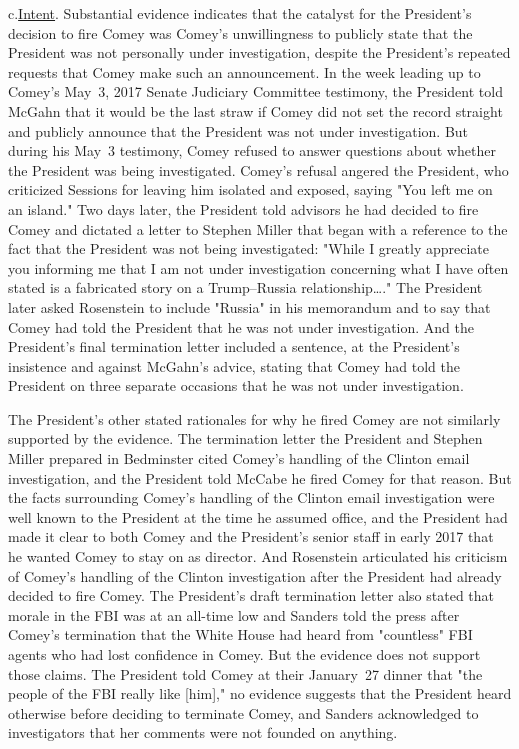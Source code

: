 c.\qquad\underline{Intent}.
Substantial evidence indicates that the catalyst for the President's decision to fire Comey was Comey's unwillingness to publicly state that the President was not personally under investigation, despite the President's repeated requests that Comey make such an announcement.
In the week leading up to Comey's May~3, 2017 Senate Judiciary Committee testimony, the President told McGahn that it would be the last straw if Comey did not set the record straight and publicly announce that the President was not under investigation.
But during his May~3 testimony, Comey refused to answer questions about whether the President was being investigated.
Comey's refusal angered the President, who criticized Sessions for leaving him isolated and exposed, saying "You left me on an island."
Two days later, the President told advisors he had decided to fire Comey and dictated a letter to Stephen Miller that began with a reference to the fact that the President was not being investigated:
"While I greatly appreciate you informing me that I am not under investigation concerning what I have often stated is a fabricated story on a Trump--Russia relationship\dots."
The President later asked Rosenstein to include "Russia" in his memorandum and to say that Comey had told the President that he was not under investigation.
And the President's final termination letter included a sentence, at the President's insistence and against McGahn's advice, stating that Comey had told the President on three separate occasions that he was not under investigation.

The President's other stated rationales for why he fired Comey are not similarly supported by the evidence.
The termination letter the President and Stephen Miller prepared in Bedminster cited Comey's handling of the Clinton email investigation, and the President told McCabe he fired Comey for that reason.
But the facts surrounding Comey's handling of the Clinton email investigation were well known to the President at the time he assumed office, and the President had made it clear to both Comey and the President's senior staff in early 2017 that he wanted Comey to stay on as director.
And Rosenstein articulated his criticism of Comey's handling of the Clinton investigation after the President had already decided to fire Comey.
The President's draft termination letter also stated that morale in the FBI was at an all-time low and Sanders told the press after Comey's termination that the White House had heard from "countless" FBI agents who had lost confidence in Comey.
But the evidence does not support those claims.
The President told Comey at their January~27 dinner that "the people of the FBI really like [him]," no evidence suggests that the President heard otherwise before deciding to terminate Comey, and Sanders acknowledged to investigators that her comments were not founded on anything.

